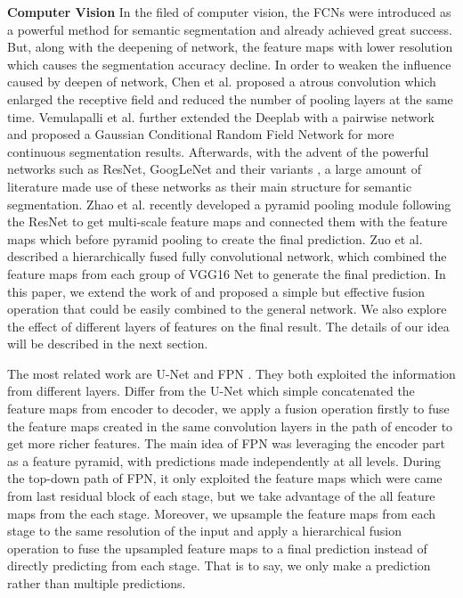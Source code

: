 \textbf{Computer Vision} In the filed of computer vision, the FCNs \cite{IEEEexample:Long_2015_CVPR} were introduced as a powerful method for semantic segmentation and already achieved great success.
 But, along with the deepening of network, the feature maps with lower resolution which causes the segmentation accuracy decline.
 In order to weaken the influence caused by deepen of network, Chen et al.\cite{IEEEexample:chen2016deeplab} proposed a atrous convolution which enlarged the receptive field and reduced the number of pooling layers at the same time.
 Vemulapalli et al.\cite{IEEEexample:vemulapalli2016gaussian} further extended the Deeplab \cite{IEEEexample:chen2016deeplab} with a pairwise network and proposed a Gaussian Conditional Random Field Network for more continuous segmentation results.
 Afterwards, with the advent of the powerful networks such as ResNet\cite{IEEEexample:he2016deep}, GoogLeNet\cite{IEEEexample:szegedy2015going} and their variants \cite{IEEEexample:szegedy2016rethinking}\cite{IEEEexample:szegedy2017inception}\cite{IEEEexample:xie2017aggregated}, a large amount of literature made use of these networks as their main structure for semantic segmentation.
 Zhao et al.\cite{IEEEexample:zhao2017contextually} recently developed a pyramid pooling module following the ResNet\cite{IEEEexample:he2016deep} to get multi-scale feature maps and connected them with the feature maps which before pyramid pooling to create the final prediction.
 Zuo et al.\cite{IEEEexample:zuo2016hf} described a hierarchically fused fully convolutional network, which combined the feature maps from each group of VGG16 Net to generate the final prediction.
 In this paper, we extend the work of\cite{IEEEexample:zuo2016hf} and proposed a simple but effective fusion operation that could be easily combined to the general network.
 We also explore the effect of different layers of features on the final result. The details of our idea will be described in the next section.


The most related work are U-Net\cite{IEEEexample:ronneberger2015u} and FPN \cite{IEEEexample:lin2017feature}. They both exploited the information from different layers. Differ from the U-Net which simple concatenated the feature maps from encoder to decoder, we apply a fusion operation firstly to fuse the feature maps created in the same convolution layers in the path of encoder to get more richer features.
The main idea of FPN was leveraging the encoder part as a feature pyramid, with predictions made independently at all levels. During the top-down path of FPN, it only exploited the feature maps which were came from last residual block of each stage, but we take advantage of the all feature maps from the each stage. Moreover, we upsample the feature maps from each stage to the same resolution of the input and apply a hierarchical fusion operation to fuse the upsampled feature maps to a final prediction instead of directly predicting from each stage. That is to say, we only make a prediction rather than multiple predictions.








